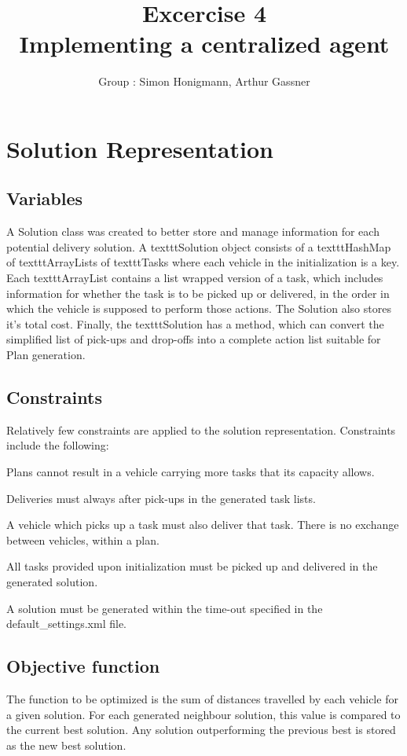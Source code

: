 \documentclass[11pt]{article}
\title{\bf Excercise 4\\ Implementing a centralized agent}
\author{Group \textnumero76: Simon Honigmann, Arthur Gassner}
\begin{document}
\maketitle
\section{Solution Representation}
\subsection{Variables}
A Solution class was created to better store and manage information for each potential delivery solution. A texttt{Solution} object consists of a texttt{HashMap} of texttt{ArrayList}s of texttt{Task}s where each vehicle in the initialization is a key. Each texttt{ArrayList} contains a list wrapped version of a task, which includes information for whether the task is to be picked up or delivered, in the order in which the vehicle is supposed to perform those actions. The Solution also stores it's total cost. Finally, the texttt{Solution} has a method, which can convert the simplified list of pick-ups and drop-offs into a complete action list suitable for Plan generation.

\subsection{Constraints}
Relatively few constraints are applied to the solution representation. Constraints include the following:

\begin{compactenum}
	\item Plans cannot result in a vehicle carrying more tasks that its capacity allows.
	\item Deliveries must always after pick-ups in the generated task lists.
	\item A vehicle which picks up a task must also deliver that task. There is no exchange between vehicles, within a plan.
	\item All tasks provided upon initialization must be picked up and delivered in the generated solution.
	\item A solution must be generated within the time-out specified in the default\_settings.xml file. 
\end{compactenum}

\subsection{Objective function}
The function to be optimized is the sum of distances travelled by each vehicle for a given solution. For each generated neighbour solution, this value is compared to the current best solution. Any solution outperforming the previous best is stored as the new best solution.
\end{document}
